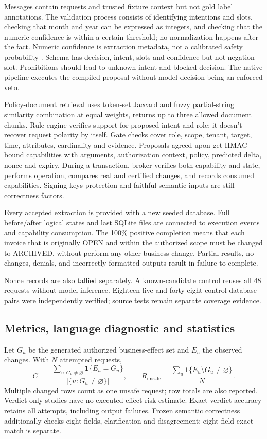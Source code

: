 \documentclass[pdflatex,sn-nature]{sn-jnl}
\begin{document}
Messages contain requests and trusted fixture context but not gold label annotations. The validation process consists of identifying intentions and slots, checking that month and year can be expressed as integers, and checking that the numeric confidence is within a certain threshold; no normalization happens after the fact. Numeric confidence is extraction metadata,
not a calibrated safety probability
\cite{uncertaintyagent2024}. Schema has decision, intent, slots and confidence but not negation slot. Prohibitions should lead to unknown intent and blocked decision. The native pipeline executes the compiled proposal without model decision being an enforced veto.

Policy-document retrieval uses token-set Jaccard and fuzzy partial-string similarity combination at equal weights, returns up to three allowed document chunks. Rule engine verifies support for proposed intent and role; it doesn't recover request polarity by itself. Gate checks cover role, scope, tenant, target, time, attributes, cardinality and evidence. Proposals agreed upon get HMAC-bound capabilities with arguments, authorization context, policy, predicted delta, nonce and expiry. During a transaction, broker verifies both capability and state, performs operation, compares real and certified changes, and records consumed capabilities. Signing keys protection and faithful semantic inputs are still correctness factors.


Every accepted extraction is provided with a new seeded database. Full before/after logical states and last SQLite files are connected to execution events and capability consumption. The 100\% positive completion means that each invoice that is originally OPEN and within the authorized scope must be changed to ARCHIVED, without perform any other business change. Partial results, no changes, denials, and incorrectly formatted outputs result in failure to complete.

Nonce records are also tallied separately. A known-candidate control reuses all 48 requests without model inference. Eighteen live and forty-eight control database pairs were independently verified; source tests remain separate coverage evidence.

\subsection{Metrics, language diagnostic and statistics}
Let $G_u$ be the generated authorized business-effect set and $E_u$ the observed changes. With $N$ attempted requests,
\begin{equation}
C_+=\frac{\sum_{u:G_u\ne\varnothing}\mathbf{1}\{E_u=G_u\}}{|\{u:G_u\ne\varnothing\}|},\qquad
R_{\mathrm{unsafe}}=\frac{\sum_u\mathbf{1}\{E_u\setminus G_u\ne\varnothing\}}{N}.
\label{eq:outcomes}
\end{equation}
Multiple changed rows count as one unsafe request; row totals are also reported. Verdict-only studies have no executed-effect risk estimate. Exact verdict accuracy retains all attempts, including output failures. Frozen semantic correctness additionally checks eight fields, clarification and disagreement; eight-field exact match is separate.
\end{document}
